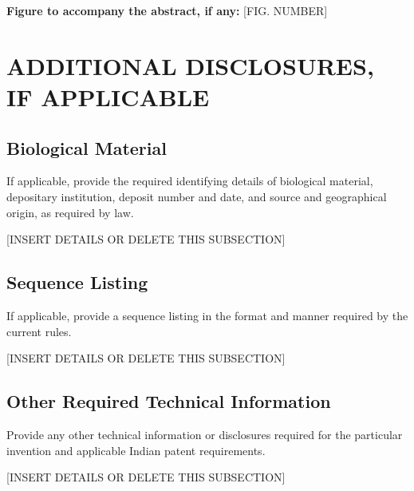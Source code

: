 \documentclass[12pt,a4paper]{article}
\begin{document}
\vspace{4mm}

\textbf{Figure to accompany the abstract, if any:}
[FIG. NUMBER]


\newpage

\section{ADDITIONAL DISCLOSURES, IF APPLICABLE}

\subsection{Biological Material}

If applicable, provide the required identifying details
of biological material, depositary institution, deposit
number and date, and source and geographical origin,
as required by law.

[INSERT DETAILS OR DELETE THIS SUBSECTION]

\subsection{Sequence Listing}

If applicable, provide a sequence listing in the format
and manner required by the current rules.

[INSERT DETAILS OR DELETE THIS SUBSECTION]

\subsection{Other Required Technical Information}

Provide any other technical information or disclosures
required for the particular invention and applicable
Indian patent requirements.

[INSERT DETAILS OR DELETE THIS SUBSECTION]
\end{document}
